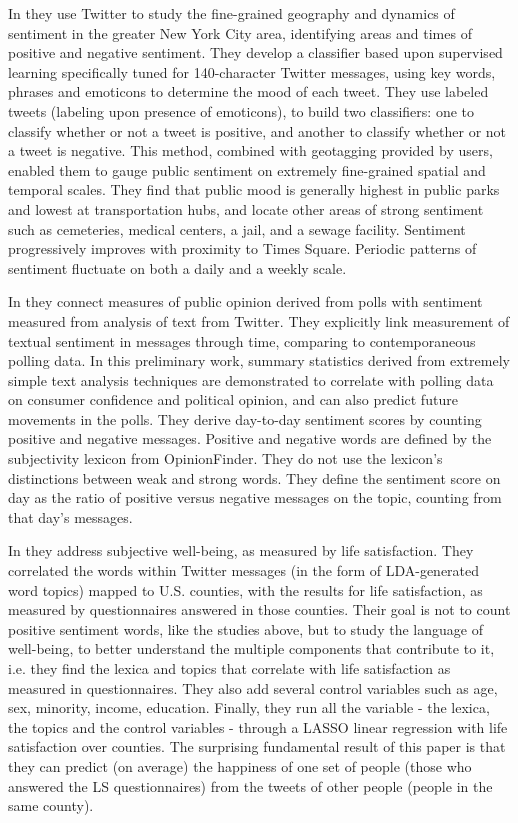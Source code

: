 \documentclass{llncs}
\begin{document}
In \cite{Bertrand2013} they use Twitter to study the fine-grained geography and dynamics of sentiment in the greater New York City area, identifying areas and times of positive and negative sentiment. They develop a classifier based upon supervised learning specifically tuned for 140-character Twitter messages, using key words, phrases and emoticons to determine the mood of each tweet. They use labeled tweets (labeling upon presence of emoticons), to build two classifiers: one to classify whether or not a tweet is positive, and another to classify whether or not a tweet is negative. This method, combined with geotagging provided by users, enabled them to gauge public sentiment on extremely fine-grained spatial and temporal scales. They find that public mood is generally highest in public parks and lowest at transportation hubs, and locate other areas of strong sentiment such as cemeteries, medical centers, a jail, and a sewage facility. Sentiment progressively improves with proximity to Times Square. Periodic patterns of sentiment fluctuate on both a daily and a weekly scale.

In \cite{Connor2010} they connect measures of public opinion derived from polls with sentiment measured from analysis of text from Twitter. They explicitly link measurement of textual sentiment in messages through time, comparing to contemporaneous polling data. In this preliminary work, summary statistics derived from extremely simple text analysis techniques are demonstrated to correlate with polling data on consumer confidence and political opinion, and can also predict future movements in the polls. They derive day-to-day sentiment scores by counting positive and negative messages. Positive and negative words are defined by the subjectivity lexicon from OpinionFinder. They do not use the lexicon's distinctions between weak and strong words. They define the sentiment score on day as the ratio of positive versus negative messages on the topic, counting from that day's messages.

In \cite{Schwartz2013} they address subjective well-being, as measured by life satisfaction. They correlated the words within Twitter messages (in the form of LDA-generated word topics) mapped to U.S. counties, with the results for life satisfaction, as measured by questionnaires answered in those counties. Their goal is not to count positive sentiment words, like the studies above, but to study the language of well-being, to better understand the multiple components that contribute to it, i.e. they find the lexica and topics that correlate with life satisfaction as measured in questionnaires. They also add several control variables such as age, sex, minority, income, education. Finally, they run all the variable - the lexica, the topics and the control variables - through a LASSO linear regression with life satisfaction over counties. The surprising fundamental result of this paper is that they can predict (on average) the happiness of one set of people (those who answered the LS questionnaires) from the tweets of other people (people in the same county).
\end{document}
